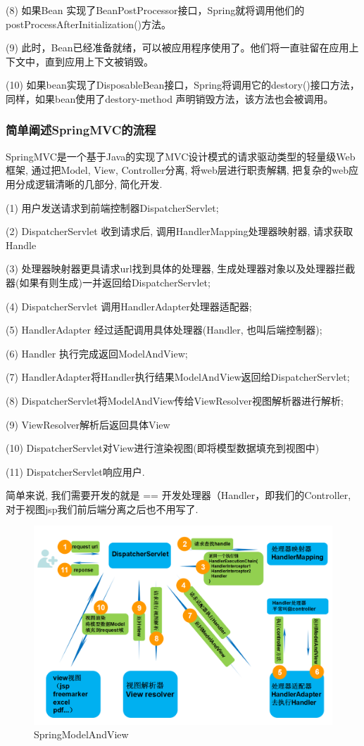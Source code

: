 \documentclass[UTF8]{ctexart}
\begin{document}
(8) 如果Bean 实现了BeanPostProcessor接口，Spring就将调用他们的postProcessAfterInitialization()方法。\par
(9) 此时，Bean已经准备就绪，可以被应用程序使用了。他们将一直驻留在应用上下文中，直到应用上下文被销毁。\par
(10) 如果bean实现了DisposableBean接口，Spring将调用它的destory()接口方法，同样，如果bean使用了destory-method 声明销毁方法，该方法也会被调用。\par
\subsubsection{简单阐述SpringMVC的流程}
SpringMVC是一个基于Java的实现了MVC设计模式的请求驱动类型的轻量级Web框架, 通过把Model, View, Controller分离, 将web层进行职责解耦, 把复杂的web应用分成逻辑清晰的几部分, 简化开发.
\par
(1) 用户发送请求到前端控制器DispatcherServlet;
\par
(2) DispatcherServlet 收到请求后, 调用HandlerMapping处理器映射器, 请求获取Handle
\par
(3) 处理器映射器更具请求url找到具体的处理器, 生成处理器对象以及处理器拦截器(如果有则生成)一并返回给DispatcherServlet;
\par
(4) DispatcherServlet 调用HandlerAdapter处理器适配器;
\par
(5) HandlerAdapter 经过适配调用具体处理器(Handler, 也叫后端控制器);
\par
(6) Handler 执行完成返回ModelAndView;
\par
(7) HandlerAdapter将Handler执行结果ModelAndView返回给DispatcherServlet;
\par
(8) DispatcherServlet将ModelAndView传给ViewResolver视图解析器进行解析;
\par
(9) ViewResolver解析后返回具体View
\par
(10) DispatcherServlet对View进行渲染视图(即将模型数据填充到视图中)
\par
(11) DispatcherServlet响应用户.
\par
简单来说, 我们需要开发的就是 == 开发处理器（Handler，即我们的Controller, 对于视图jsp我们前后端分离之后也不用写了.
\begin{figure}
	\centering
	\includegraphics[width=0.7\linewidth]{figures/SpringModelAndView.png}
	\caption{SpringModelAndView}
	\label{fig:SpringModelAndView}
\end{figure}
\end{document}
